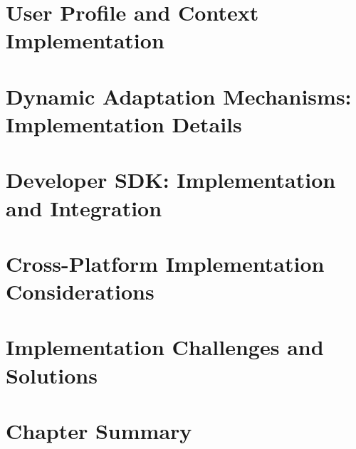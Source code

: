 \documentclass[openany]{book}
\begin{document}
\section{User Profile and Context Implementation}

\section{Dynamic Adaptation Mechanisms: Implementation Details}

\section{Developer SDK: Implementation and Integration}

\section{Cross-Platform Implementation Considerations}
\section{Implementation Challenges and Solutions}

\section{Chapter Summary}
\end{document}

